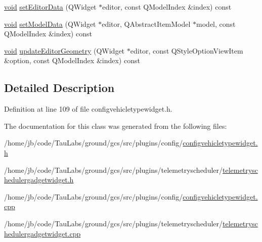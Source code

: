 \begin{DoxyCompactItemize}
\hyperlink{group___u_a_v_objects_plugin_ga444cf2ff3f0ecbe028adce838d373f5c}{void} \hyperlink{group___telemetry_scheduler_gadget_plugin_gacbac1fc1091ef04b08ca9683a1d6f0ee}{set\-Editor\-Data} (\-Q\-Widget $\ast$editor, const \-Q\-Model\-Index \&index) const 
\item 
\hyperlink{group___u_a_v_objects_plugin_ga444cf2ff3f0ecbe028adce838d373f5c}{void} \hyperlink{group___telemetry_scheduler_gadget_plugin_ga3698304b3741f548b0b4755c1782d291}{set\-Model\-Data} (\-Q\-Widget $\ast$editor, \-Q\-Abstract\-Item\-Model $\ast$model, const \-Q\-Model\-Index \&index) const 
\item 
\hyperlink{group___u_a_v_objects_plugin_ga444cf2ff3f0ecbe028adce838d373f5c}{void} \hyperlink{group___telemetry_scheduler_gadget_plugin_ga3a90cff710ddd79a11b31054f9c963fb}{update\-Editor\-Geometry} (\-Q\-Widget $\ast$editor, const \-Q\-Style\-Option\-View\-Item \&option, const \-Q\-Model\-Index \&index) const 
\end{DoxyCompactItemize}


\subsection{\-Detailed \-Description}


\-Definition at line 109 of file configvehicletypewidget.\-h.



\-The documentation for this class was generated from the following files\-:\begin{DoxyCompactItemize}
\item 
/home/jb/code/\-Tau\-Labs/ground/gcs/src/plugins/config/\hyperlink{configvehicletypewidget_8h}{configvehicletypewidget.\-h}\item 
/home/jb/code/\-Tau\-Labs/ground/gcs/src/plugins/telemetryscheduler/\hyperlink{telemetryschedulergadgetwidget_8h}{telemetryschedulergadgetwidget.\-h}\item 
/home/jb/code/\-Tau\-Labs/ground/gcs/src/plugins/config/\hyperlink{configvehicletypewidget_8cpp}{configvehicletypewidget.\-cpp}\item 
/home/jb/code/\-Tau\-Labs/ground/gcs/src/plugins/telemetryscheduler/\hyperlink{telemetryschedulergadgetwidget_8cpp}{telemetryschedulergadgetwidget.\-cpp}\end{DoxyCompactItemize}
